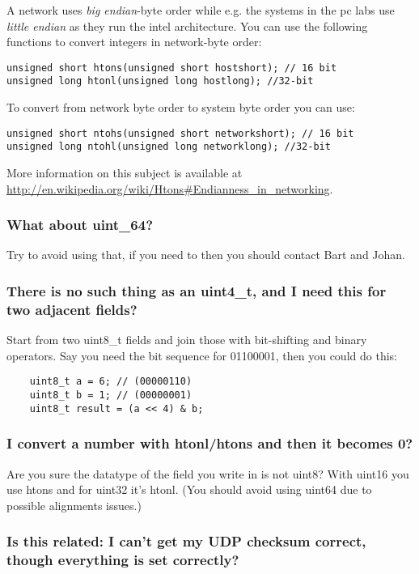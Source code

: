 \documentclass[a4paper]{article}
\begin{document}
A network uses \emph{big endian}-byte order while e.g. the systems in
the pc labs use \emph{little endian} as they run the intel architecture.
You can use the following functions to convert integers in network-byte
order:
\begin{lstlisting}
unsigned short htons(unsigned short hostshort); // 16 bit
unsigned long htonl(unsigned long hostlong); //32-bit
\end{lstlisting}

To convert from network byte order to system byte order you can use:
\begin{lstlisting}
unsigned short ntohs(unsigned short networkshort); // 16 bit
unsigned long ntohl(unsigned long networklong); //32-bit
\end{lstlisting}

More information on this subject is available at \url{http://en.wikipedia.org/wiki/Htons\#Endianness_in_networking}.

\subsubsection*{What about uint\_64?}

Try to avoid using that, if you need to then you should contact Bart and
Johan.

\subsubsection*{There is no such thing as an uint4\_t, and I need this for two adjacent
fields?}

Start from two uint8\_t fields and join those with bit-shifting and
binary operators. Say you need the bit sequence for 01100001, then you
could do this:

\begin{lstlisting}
	uint8_t a = 6; // (00000110)
	uint8_t b = 1; // (00000001)
	uint8_t result = (a << 4) & b;
\end{lstlisting}

\subsubsection*{I convert a number with htonl/htons and then it becomes 0?}

Are you sure the datatype of the field you write in is not uint8? With
uint16 you use htons and for uint32 it's htonl. (You should avoid using
uint64 due to possible alignments issues.)

\subsubsection*{Is this related: I can't get my UDP checksum correct, though everything
is set correctly?}
\end{document}
